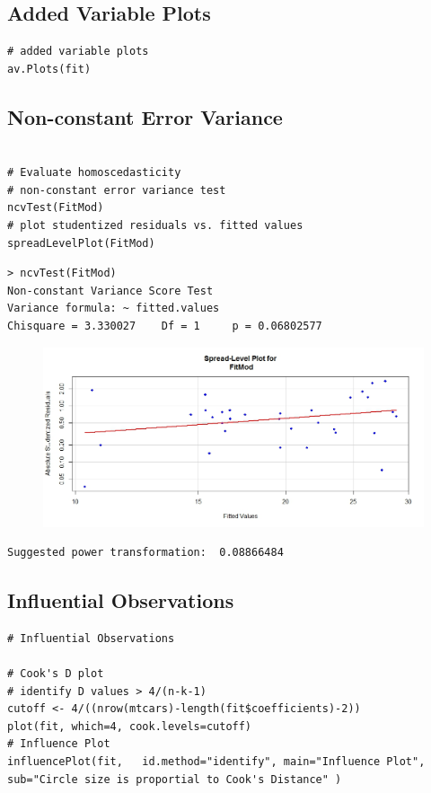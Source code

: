 \documentclass[12pt, a4paper]{article}
\theoremstyle{plain}
\theoremstyle{definition}
\theoremstyle{remark}
\begin{document}
\subsection{Added Variable Plots}
\begin{framed}
\begin{verbatim}
# added variable plots 
av.Plots(fit)
\end{verbatim}
\end{framed}

\subsection{Non-constant Error Variance}
\begin{framed}
\begin{verbatim}

# Evaluate homoscedasticity
# non-constant error variance test
ncvTest(FitMod)
# plot studentized residuals vs. fitted values 
spreadLevelPlot(FitMod)
\end{verbatim}
\end{framed}

\begin{verbatim}
> ncvTest(FitMod)
Non-constant Variance Score Test 
Variance formula: ~ fitted.values 
Chisquare = 3.330027    Df = 1     p = 0.06802577 
\end{verbatim}


\begin{figure}[h!]
\centering
\includegraphics[width=0.7\linewidth]{./mtcarsSpreadLevelPlot}
\label{mtcarsSpreadLevelPlot}
\end{figure}


\begin{verbatim}
Suggested power transformation:  0.08866484 
\end{verbatim}

\subsection{Influential Observations}
\begin{framed}
\begin{verbatim}
# Influential Observations

# Cook's D plot
# identify D values > 4/(n-k-1) 
cutoff <- 4/((nrow(mtcars)-length(fit$coefficients)-2)) 
plot(fit, which=4, cook.levels=cutoff)
# Influence Plot 
influencePlot(fit,	 id.method="identify", main="Influence Plot", sub="Circle size is proportial to Cook's Distance" )
\end{verbatim}
\end{framed}
\end{document}
